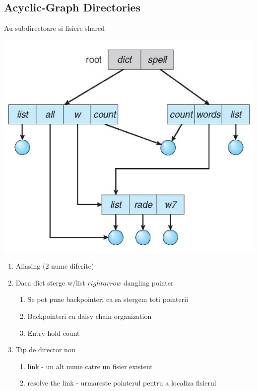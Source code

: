 \documentclass{article}
\begin{document}
\subsection*{Acyclic-Graph Directories}
Au subdirectoare si fisiere shared
\begin{center}
    \includegraphics[scale=0.4]{45-agd.png}
\end{center}

\begin{enumerate}
    \item Aliasing (2 nume diferite)
    \item Daca dict sterge w/list $rightarrow$ dangling pointer
          \begin{enumerate}
              \item Se pot pune backpointeri ca sa stergem toti pointerii
              \item Backpointeri cu daisy chain organization
              \item Entry-hold-count
          \end{enumerate}
    \item Tip de director nou
          \begin{enumerate}
              \item link - un alt nume catre un fisier existent
              \item resolve the link - urmareste pointerul pentru a localiza fisierul
          \end{enumerate}
\end{enumerate}
\end{document}

